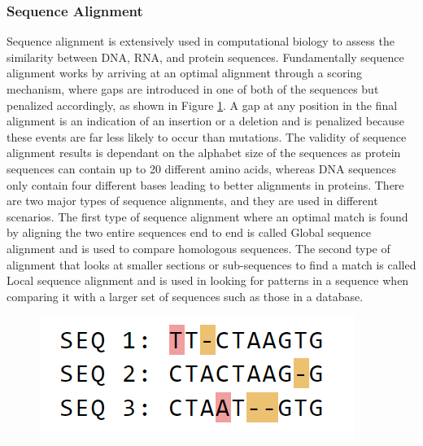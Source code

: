 \subsubsection{Sequence Alignment}
Sequence alignment is extensively used in computational biology to assess the similarity between DNA, RNA, and protein sequences. Fundamentally sequence alignment works by arriving at an optimal alignment through a scoring mechanism, where gaps are introduced in one of both of the sequences but penalized accordingly, as shown in Figure \ref{fig:ch_2_sequence_alignment_multi}. A gap at any position in the final alignment is an indication of an insertion or a deletion and is penalized because these events are far less likely to occur than mutations. The validity of sequence alignment results is dependant on the alphabet size of the sequences  as protein sequences can contain up to 20 different amino acids, whereas DNA sequences only contain four different bases leading to better alignments in proteins. There are two major types of sequence alignments, and they are used in different scenarios. The first type of sequence alignment where an optimal match is found by aligning the two entire sequences end to end is called Global sequence alignment and is used to compare homologous sequences. The second type of alignment that looks at smaller sections or sub-sequences to find a match is called Local sequence alignment and is used in looking for patterns in a sequence when comparing it with a larger set of sequences such as those in a database. 

\begin{figure}
  \centering
  \includegraphics[width=.45\linewidth]{images/ch_2_sequence_alignment_multi.PNG}
  \label{fig:ch_2_sequence_alignment_multi}
\end{figure}


